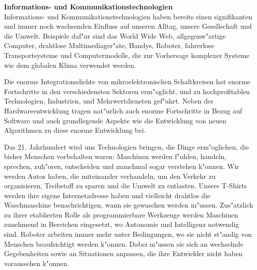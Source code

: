 \documentclass[11pt,a4paper]{article}
\begin{document}
{\Large\bf{Informations- und Kommunikationstechnologien}}\\[1ex]

Informations- und Kommunikationstechnologien haben bereits einen signifikanten und immer noch
wachsenden Einfluss auf unseren Alltag, unsere Gesellschaft und die Umwelt. Beispiele
daf"ur sind das World Wide Web, allgegenw"artige Computer, drahtlose Multimediager"ate,
Handys, Roboter, fahrerlose Transportsysteme und Computermodelle, die zur
Vorhersage komplexer Systeme wie dem globalen Klima verwendet werden. 

Die enorme Integrationsdichte von mikroelektronischen Schaltkreisen hat enorme
Fortschritte in den verschiedensten Sektoren erm"oglicht, und zu hochprofitablen
Technologien, Industrien, und Mehrwertdiensten gef"uhrt. Neben der Hardwareentwicklung tragen nat"urlich auch enorme Fortschritte in Bezug auf Software und auch grundlegende Aspekte wie die Entwicklung von neuen Algorithmen zu diese enorme Entwicklung bei. 

Das 21. Jahrhundert wird uns Technologien bringen, die Dinge erm"oglichen, die bisher
Menschen vorbehalten waren: Maschinen werden f"uhlen, handeln, sprechen, zuh"oren,
entscheiden und manchmal sogar verstehen k"onnen. Wir werden Autos haben, die miteinander
verhandeln, um den Verkehr zu organisieren, Treibstoff zu sparen und die Umwelt zu
entlasten. Unsere T-Shirts werden ihre eigene Internetadresse haben und vielleicht drahtlos
die Waschmaschine benachrichtigen, wann sie gewaschen werden m"ussen. Zus"atzlich zu ihrer
etablierten Rolle als programmierbare Werkzeuge werden Maschinen zunehmend in
Bereichen eingesetzt, wo Autonomie und Intelligenz notwendig sind. Roboter arbeiten immer mehr
unter Bedingungen, wo sie nicht st"andig von Menschen beaufsichtigt
werden k"onnen. Dabei m"ussen sie sich an wechselnde Gegebenheiten sowie an
Situationen anpassen, die ihre Entwickler nicht haben voraussehen k"onnen.
\end{document}
